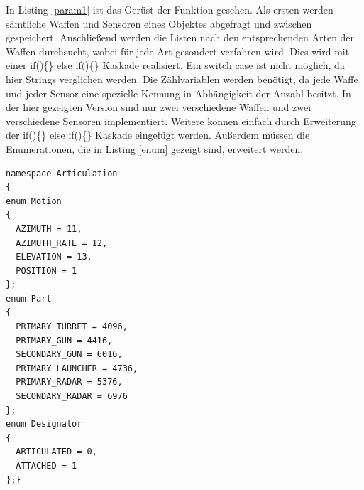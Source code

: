 In Listing \ref{param1} ist das Gerüst der Funktion gesehen. Als ersten werden sämtliche Waffen und Sensoren eines Objektes abgefragt und zwischen gespeichert. Anschließend werden die Listen nach den entsprechenden Arten der Waffen durchsucht, wobei für jede Art gesondert verfahren wird. Dies wird mit einer \glqq if()\{\} else if()\{\}\grqq{} Kaskade realisiert. Ein \glqq switch case \grqq{} ist nicht möglich, da hier Strings verglichen werden. Die Zählvariablen werden benötigt, da jede Waffe und jeder Sensor eine spezielle Kennung in Abhängigkeit der Anzahl besitzt. In der hier gezeigten Version sind nur zwei verschiedene Waffen und zwei verschiedene Sensoren implementiert. Weitere können einfach durch Erweiterung der  \glqq if()\{\} else if()\{\}\grqq{} Kaskade eingefügt werden. Außerdem müssen die Enumerationen, die in Listing \ref{enum} gezeigt sind, erweitert werden. 
\begin{lstlisting}[caption = Parameter Enumeration ,label= enum]
namespace Articulation
{
enum Motion
{
  AZIMUTH = 11,
  AZIMUTH_RATE = 12,
  ELEVATION = 13,
  POSITION = 1
};
enum Part
{
  PRIMARY_TURRET = 4096,
  PRIMARY_GUN = 4416,
  SECONDARY_GUN = 6016,
  PRIMARY_LAUNCHER = 4736,
  PRIMARY_RADAR = 5376,
  SECONDARY_RADAR = 6976
};
enum Designator
{
  ARTICULATED = 0,
  ATTACHED = 1
};}
\end{lstlisting}

